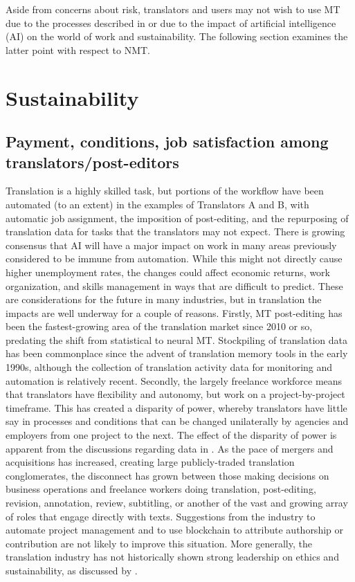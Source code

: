 \documentclass[output=paper]{langscibook}
\begin{document}
Aside from concerns about risk, translators and users may not wish to use MT due to the processes described in  or due to the impact of artificial intelligence (AI) on the world of work and sustainability. The following section examines the latter point with respect to NMT.

\section{Sustainability}\label{sec:moorkens:4}
\subsection{Payment, conditions, job satisfaction among translators/post-editors} 

Translation is a highly skilled task, but portions of the workflow have been automated (to an extent) in the examples of Translators A and B, with automatic job assignment, the imposition of post-editing, and the repurposing of translation data for tasks that the translators may not expect. There is growing consensus that AI will have a major impact on work in many areas previously considered to be immune from automation. While this might not directly cause higher unemployment rates, the changes could affect economic returns, work organization, and skills management in ways that are difficult to predict. These are considerations for the future in many industries, but in translation the impacts are well underway for a couple of reasons. Firstly, MT post-editing has been the fastest-growing area of the translation market since 2010 or so, predating the shift from statistical to neural MT. Stockpiling of translation data has been commonplace since the advent of translation memory tools in the early 1990s, although the collection of translation activity data for monitoring and automation is relatively recent. Secondly, the largely freelance workforce means that translators have flexibility and autonomy, but work on a project-by-project timeframe. This has created a disparity of power, whereby translators have little say in processes and conditions that can be changed unilaterally by agencies and employers from one project to the next. The effect of the disparity of power is apparent from the discussions regarding data in . As the pace of mergers and acquisitions has increased, creating large publicly-traded translation conglomerates, the disconnect has grown between those making decisions on business operations and freelance workers doing translation, post-editing, revision, annotation, review, subtitling, or another of the vast and growing array of roles that engage directly with texts. Suggestions from the industry to automate project management and to use blockchain to attribute authorship or contribution are not likely to improve this situation. More generally, the translation industry has not historically shown strong leadership on ethics and sustainability, as discussed by \citet{MoorkensRocchi2021}.
\end{document}

